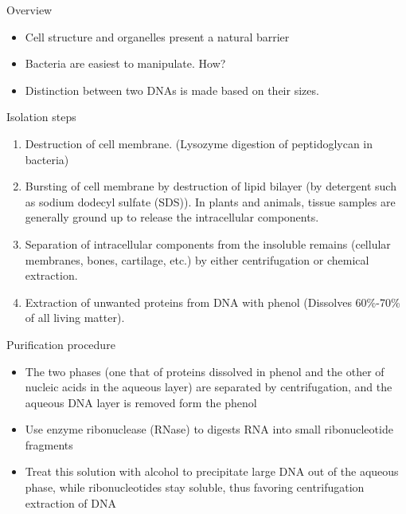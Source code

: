 \documentclass[
  ignorenonframetext,
  aspectratio=169]{beamer}
\providecommand{\tightlist}{%
  \setlength{\itemsep}{0pt}\setlength{\parskip}{0pt}}
\begin{document}
\begin{frame}{Overview}
\protect\hypertarget{overview}{}
\begin{itemize}
\tightlist
\item
  Cell structure and organelles present a natural barrier
\item
  Bacteria are easiest to manipulate. How?
\item
  Distinction between two DNAs is made based on their sizes.
\end{itemize}
\end{frame}

\begin{frame}{Isolation steps}
\protect\hypertarget{isolation-steps}{}
\begin{enumerate}
\tightlist
\item
  Destruction of cell membrane. (Lysozyme digestion of peptidoglycan in
  bacteria)
\item
  Bursting of cell membrane by destruction of lipid bilayer (by
  detergent such as sodium dodecyl sulfate (SDS)). In plants and
  animals, tissue samples are generally ground up to release the
  intracellular components.
\item
  Separation of intracellular components from the insoluble remains
  (cellular membranes, bones, cartilage, etc.) by either centrifugation
  or chemical extraction.
\item
  Extraction of unwanted proteins from DNA with phenol (Dissolves
  60\%-70\% of all living matter).
\end{enumerate}
\end{frame}

\begin{frame}{Purification procedure}
\protect\hypertarget{purification-procedure}{}
\begin{itemize}
\tightlist
\item
  The two phases (one that of proteins dissolved in phenol and the other
  of nucleic acids in the aqueous layer) are separated by
  centrifugation, and the aqueous DNA layer is removed form the phenol
\item
  Use enzyme ribonuclease (RNase) to digests RNA into small
  ribonucleotide fragments
\item
  Treat this solution with alcohol to precipitate large DNA out of the
  aqueous phase, while ribonucleotides stay soluble, thus favoring
  centrifugation extraction of DNA
\end{itemize}
\end{frame}
\end{document}
